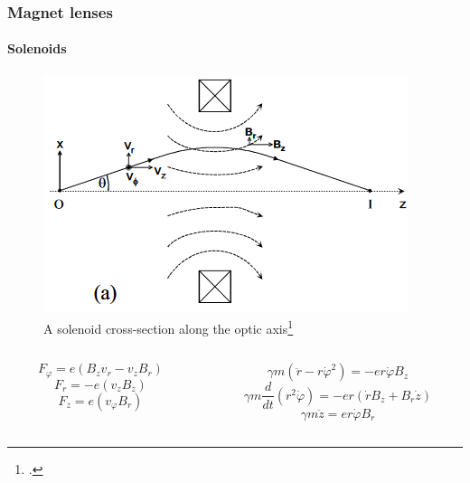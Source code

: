 \documentclass[10pt]{beamer}
\newcommand{\rfn}{\setcounter{footnote}{0}}
\begin{document}
\begin{frame}
  \frametitle{Magnet lenses}
  \framesubtitle{Solenoids}
  \rfn
  \begin{figure}
    \includegraphics[width=.5\textwidth]{El_traj_in_B1.png}
    \caption{A solenoid cross-section along the optic axis\footcite{Egerton}}
  \end{figure}
  \begin{scriptsize}
  \begin{columns}
    \begin{column}{0.45\textwidth}
      \begin{equation}
        F_{\varphi}=e\left(B_{z}v_{r} - v_{z}B_{r}\right)
      \end{equation}
      \begin{equation}
        F_{r}=-e\left(v_{z}B_{z}\right)
      \end{equation}
      \begin{equation}
        F_{z}=e\left(v_{\varphi}B_{r}\right)
      \end{equation}
    \end{column}
    \begin{column}{0.55\textwidth}
      \begin{equation}
        \gamma m\left(\ddot{r}-r\dot{\varphi}^{2}\right)=-er\dot{\varphi}B_{z}
      \end{equation}
      \begin{equation}
        \gamma m\frac{d}{dt}\left(r^{2}\dot{\varphi}\right)=-er(\dot rB_{z}+B_{r}\dot{z})
      \end{equation}
      \begin{equation}
        \gamma m\ddot{z}=er\dot{\varphi}B_{r}
      \end{equation}
    \end{column}
  \end{columns}
  \end{scriptsize}
\end{frame}
\end{document}
